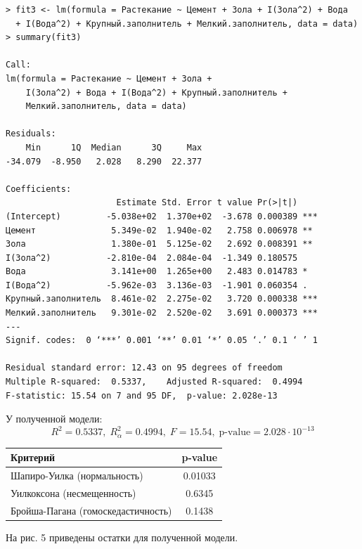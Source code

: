 \documentclass[10pt]{article}
\begin{document}
\begin{verbatim}
> fit3 <- lm(formula = Растекание ~ Цемент + Зола + I(Зола^2) + Вода
  + I(Вода^2) + Крупный.заполнитель + Мелкий.заполнитель, data = data)
> summary(fit3)

Call:
lm(formula = Растекание ~ Цемент + Зола + 
    I(Зола^2) + Вода + I(Вода^2) + Крупный.заполнитель + 
    Мелкий.заполнитель, data = data)

Residuals:
    Min      1Q  Median      3Q     Max 
-34.079  -8.950   2.028   8.290  22.377 

Coefficients:
                      Estimate Std. Error t value Pr(>|t|)    
(Intercept)         -5.038e+02  1.370e+02  -3.678 0.000389 ***
Цемент               5.349e-02  1.940e-02   2.758 0.006978 ** 
Зола                 1.380e-01  5.125e-02   2.692 0.008391 ** 
I(Зола^2)           -2.810e-04  2.084e-04  -1.349 0.180575    
Вода                 3.141e+00  1.265e+00   2.483 0.014783 *  
I(Вода^2)           -5.962e-03  3.136e-03  -1.901 0.060354 .  
Крупный.заполнитель  8.461e-02  2.275e-02   3.720 0.000338 ***
Мелкий.заполнитель   9.301e-02  2.520e-02   3.691 0.000373 ***
---
Signif. codes:  0 ‘***’ 0.001 ‘**’ 0.01 ‘*’ 0.05 ‘.’ 0.1 ‘ ’ 1

Residual standard error: 12.43 on 95 degrees of freedom
Multiple R-squared:  0.5337,	Adjusted R-squared:  0.4994 
F-statistic: 15.54 on 7 and 95 DF,  p-value: 2.028e-13
\end{verbatim}

У полученной модели:
$$
  R^2 = 0.5337, \; R^2_{\alpha} = 0.4994, \; F = 15.54, \; \text{p-value} = 2.028 \cdot 10^{-13}
$$

\begin{tabularx}{\textwidth}{ |X|c| }
  \hline
  Критерий & p-value \\
  \hline
  Шапиро-Уилка (нормальность) & 0.01033 \\
  \hline
  Уилкоксона (несмещенность) & 0.6345 \\
  \hline
  Бройша-Пагана (гомоскедастичность) & 0.1438 \\
  \hline
\end{tabularx}

\bigskip

На рис. 5 приведены остатки для полученной модели.
\end{document}
